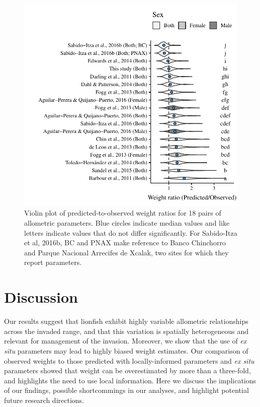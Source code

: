 \documentclass[fleqn,10pt,lineno]{wlpeerj} %
\begin{document}
\begin{figure}
\centering
\includegraphics{Manuscript_files/figure-latex/pred_obs-1.pdf}
\caption{\label{fig:bio_ratio}Violin plot of predicted-to-observed
weight ratios for 18 pairs of allometric parameters. Blue circles
indicate median values and like letters indicate values that do not
differ significantly. For Sabido-Itza et al, 2016b, BC and PNAX make
reference to Banco Chinchorro and Parque Nacional Arrecifes de Xcalak,
two sites for which they report parameters.}
\end{figure}

\clearpage

\section*{Discussion}

Our results suggest that lionfish exhibit highly variable allometric
relationships across the invaded range, and that this variation is
spatially heterogeneous and relevant for management of the invasion.
Moreover, we show that the use of \emph{ex situ} parameters may lead to
highly biased weight estimates. Our comparison of observed weights to
those predicted with locally-informed parameters and \emph{ex situ}
parameters showed that weight can be overestimated by more than a
three-fold, and highlights the need to use local information. Here we
discuss the implications of our findings, possible shortcommings in our
analyses, and highlight potential future research directions.
\end{document}

